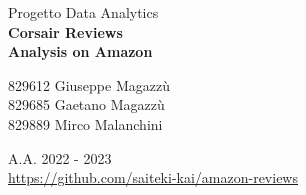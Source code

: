 \begin{titlepage}
  \vfill
  {\LARGE Progetto Data Analytics}\\[1cm]
  {\Huge\bfseries Corsair Reviews \\Analysis on Amazon}\\[0.4cm]
  \vfill


  \large
  829612 Giuseppe Magazzù \\
  829685 Gaetano Magazzù \\
  829889 Mirco Malanchini \\[0.4cm]
  \vfill


  {\large A.A. 2022 - 2023}\\[2cm]

  {\url{https://github.com/saiteki-kai/amazon-reviews}}


  \vfill %
\end{titlepage}

